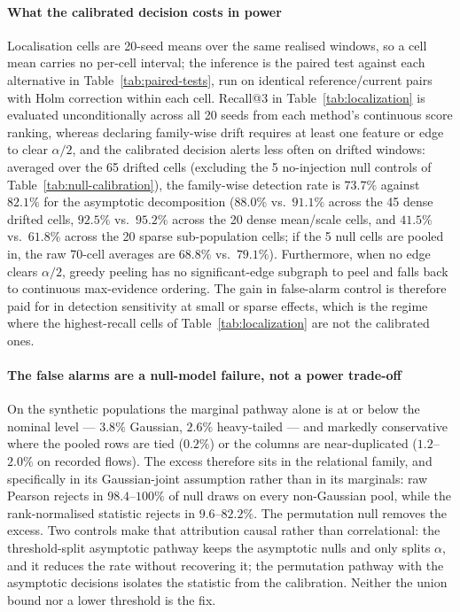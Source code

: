 

\paragraph{What the calibrated decision costs in power}
Localisation cells are 20-seed means over the same realised windows, so a cell mean carries
no per-cell interval; the inference is the paired test against each alternative in
Table~\ref{tab:paired-tests}, run on identical reference/current pairs with Holm
correction within each cell. Recall@3 in Table~\ref{tab:localization} is evaluated
unconditionally across all 20 seeds from each method's continuous score ranking, whereas
declaring family-wise drift requires at least one feature or edge to clear $\alpha/2$, and
the calibrated decision alerts less often on drifted windows: averaged over the 65 drifted
cells (excluding the 5 no-injection null controls of Table~\ref{tab:null-calibration}),
the family-wise detection rate is $73.7\%$ against $82.1\%$ for the asymptotic
decomposition ($88.0\%$ vs.\ $91.1\%$ across the 45 dense drifted cells, $92.5\%$ vs.\
$95.2\%$ across the 20 dense mean/scale cells, and $41.5\%$ vs.\ $61.8\%$ across the 20
sparse sub-population cells; if the 5 null cells are pooled in, the raw 70-cell averages
are $68.8\%$ vs.\ $79.1\%$). Furthermore, when no edge clears $\alpha/2$, greedy peeling
has no significant-edge subgraph to peel and falls back to continuous max-evidence ordering.
The gain in false-alarm control is therefore paid for in detection sensitivity at small or
sparse effects, which is the regime where the highest-recall cells of
Table~\ref{tab:localization} are not the calibrated ones.

\paragraph{The false alarms are a null-model failure, not a power trade-off}
On the synthetic populations the marginal pathway alone is at or below the nominal level
--- $3.8\%$ Gaussian, $2.6\%$ heavy-tailed --- and markedly conservative where the pooled
rows are tied ($0.2\%$) or the columns are near-duplicated ($1.2$--$2.0\%$ on recorded
flows). The excess therefore sits in the relational family, and specifically in its
Gaussian-joint assumption rather than in its marginals: raw Pearson rejects in
$98.4$--$100\%$ of null draws on every non-Gaussian pool, while the rank-normalised
statistic rejects in $9.6$--$82.2\%$. The permutation null removes the excess. Two
controls make that attribution causal rather than correlational: the threshold-split
asymptotic pathway keeps the asymptotic nulls and only splits $\alpha$, and it reduces
the rate without recovering it; the permutation pathway with the asymptotic decisions
isolates the statistic from the calibration. Neither the union bound nor a lower
threshold is the fix.

